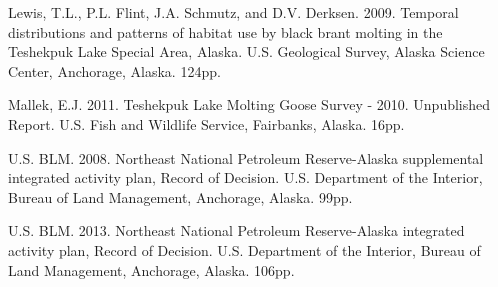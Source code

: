 \documentclass[]{article}
\begin{document}
Lewis, T.L., P.L. Flint, J.A. Schmutz, and D.V. Derksen. 2009. Temporal
distributions and patterns of habitat use by black brant molting in the
Teshekpuk Lake Special Area, Alaska. U.S. Geological Survey, Alaska
Science Center, Anchorage, Alaska. 124pp.

Mallek, E.J. 2011. Teshekpuk Lake Molting Goose Survey - 2010.
Unpublished Report. U.S. Fish and Wildlife Service, Fairbanks, Alaska.
16pp.

U.S. BLM. 2008. Northeast National Petroleum Reserve-Alaska supplemental
integrated activity plan, Record of Decision. U.S. Department of the
Interior, Bureau of Land Management, Anchorage, Alaska. 99pp.

U.S. BLM. 2013. Northeast National Petroleum Reserve-Alaska integrated
activity plan, Record of Decision. U.S. Department of the Interior,
Bureau of Land Management, Anchorage, Alaska. 106pp.
\end{document}
